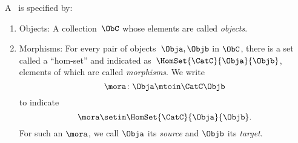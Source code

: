 \begin{ctdefinition}[Semicategory]
    \label{def:semicategory-compact}
    A \emph{}~\CatC is specified by:
    \begin{body}
        \constit
        \begin{enumerate}
            \item Objects: A collection\footnotemark~$\ObC$ whose elements are called \emph{objects}.
            \item Morphisms: For every pair of objects~$\Obja,\Objb$ in $\ObC$, there is a set called a ``hom-set'' and indicated as~$\HomSet{\CatC}{\Obja}{\Objb}$, elements of which are called \emph{morphisms}.
                  We write
                  \begin{equation}
                      \mora \colon \Obja \mtoin\CatC \Objb
                  \end{equation}
                  to indicate
                  \begin{equation}
                      \mora \setin \HomSet{\CatC}{\Obja}{\Objb}.
                  \end{equation}
                  For such an $\mora$, we call $\Obja$ its \emph{source} and $\Objb$ its \emph{target}.


\end{enumerate}
\end{body}
\end{ctdefinition}
